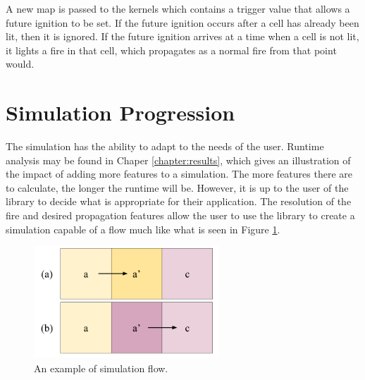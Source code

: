 A new map is passed to the kernels which contains a trigger value that allows a future ignition to be set. If the future ignition occurs after a cell has already been lit, then it is ignored. If the future ignition arrives at a time when a cell is not lit, it lights a fire in that cell, which propagates as a normal fire from that point would. 

\section{Simulation Progression}
The simulation has the ability to adapt to the needs of the user. Runtime analysis may be found in Chaper \ref{chapter:results}, which gives an illustration of the impact of adding more features to a simulation. The more features there are to calculate, the longer the runtime will be. However, it is up to the user of the library to decide what is appropriate for their application. The resolution of the fire and desired propagation features allow the user to use the library to create a simulation capable of a flow much like what is seen in Figure \ref{fig:simflow}.

\begin{figure}%
\centering
  \includegraphics[height=4.2cm]{figures/implementation/read-write-issue.png}
  \caption{An example of simulation flow.}
  \label{fig:simflow}
\end{figure}

